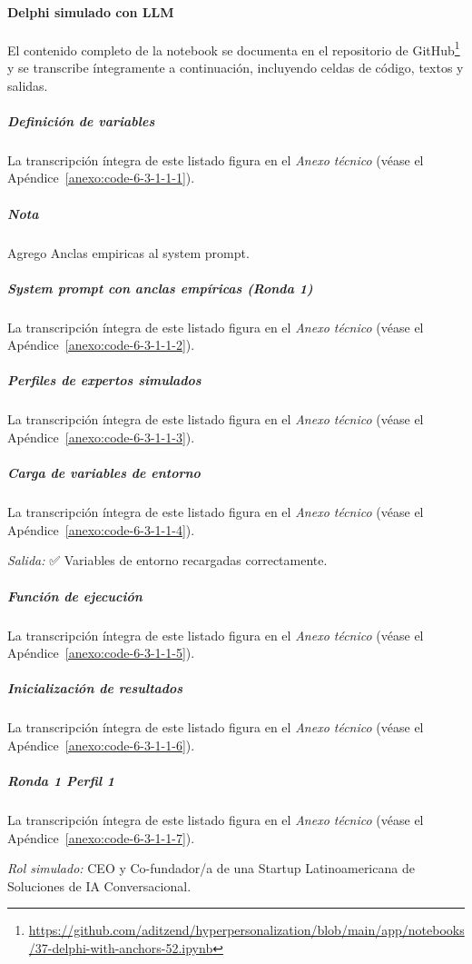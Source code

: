\paragraph{Delphi simulado con LLM}

El contenido completo de la notebook se documenta en el repositorio de GitHub\footnote{\url{https://github.com/aditzend/hyperpersonalization/blob/main/app/notebooks/37-delphi-with-anchors-52.ipynb}} y se transcribe íntegramente a continuación, incluyendo celdas de código, textos y salidas.

\subparagraph{Definición de variables}

La transcripción íntegra de este listado figura en el \textit{Anexo técnico} (véase el Apéndice~\ref{anexo:code-6-3-1-1-1}).

\subparagraph{Nota}

Agrego Anclas empiricas al system prompt.

\subparagraph{System prompt con anclas empíricas (Ronda 1)}

La transcripción íntegra de este listado figura en el \textit{Anexo técnico} (véase el Apéndice~\ref{anexo:code-6-3-1-1-2}).

\subparagraph{Perfiles de expertos simulados}

La transcripción íntegra de este listado figura en el \textit{Anexo técnico} (véase el Apéndice~\ref{anexo:code-6-3-1-1-3}).

\subparagraph{Carga de variables de entorno}

La transcripción íntegra de este listado figura en el \textit{Anexo técnico} (véase el Apéndice~\ref{anexo:code-6-3-1-1-4}).

\textit{Salida:} ✅ Variables de entorno recargadas correctamente.

\subparagraph{Función de ejecución}

La transcripción íntegra de este listado figura en el \textit{Anexo técnico} (véase el Apéndice~\ref{anexo:code-6-3-1-1-5}).

\subparagraph{Inicialización de resultados}

La transcripción íntegra de este listado figura en el \textit{Anexo técnico} (véase el Apéndice~\ref{anexo:code-6-3-1-1-6}).

\subparagraph{Ronda 1 Perfil 1}

La transcripción íntegra de este listado figura en el \textit{Anexo técnico} (véase el Apéndice~\ref{anexo:code-6-3-1-1-7}).

\textit{Rol simulado:} CEO y Co-fundador/a de una Startup Latinoamericana de Soluciones de IA Conversacional.

